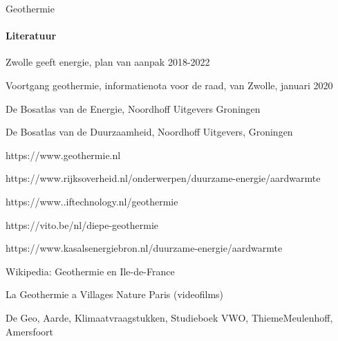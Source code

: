 \begin{voorstel}{Geothermie}
\paragraph{Literatuur}
Zwolle geeft energie, plan van aanpak 2018-2022

Voortgang geothermie, informatienota voor de raad, van Zwolle, januari 2020

De Bosatlas van de Energie, Noordhoff  Uitgevers Groningen

De Bosatlas van de Duurzaamheid, Noordhoff Uitgevers, Groningen

https://www.geothermie.nl

https://www.rijksoverheid.nl/onderwerpen/duurzame-energie/aardwarmte

https://www..iftechnology.nl/geothermie

https://vito.be/nl/diepe-geothermie

https://www.kasalsenergiebron.nl/duurzame-energie/aardwarmte

Wikipedia: Geothermie en Ile-de-France

La Geothermie a Villages Nature Paris (videofilms)

De Geo, Aarde, Klimaatvraagstukken, Studieboek VWO, ThiemeMeulenhoff, Amersfoort
\end{voorstel}
